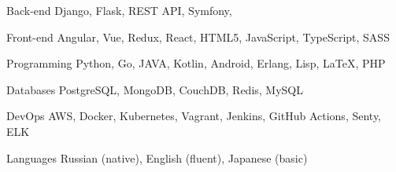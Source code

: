 

\begin{cvskills}

  \cvskill
    {Back-end} %
    {Django, Flask, REST API, Symfony, } %

  \cvskill
    {Front-end} %
    {Angular, Vue, Redux, React, HTML5, JavaScript, TypeScript, SASS} %

  \cvskill
    {Programming} %
    {Python, Go, JAVA, Kotlin, Android, Erlang, Lisp, LaTeX, PHP} %

  \cvskill
    {Databases} %
    {PostgreSQL, MongoDB, CouchDB, Redis, MySQL}

  \cvskill
    {DevOps} %
    {AWS, Docker, Kubernetes, Vagrant, Jenkins, GitHub Actions, Senty, ELK} %

  \cvskill
    {Languages} %
    {Russian (native), English (fluent), Japanese (basic)} %

\end{cvskills}
